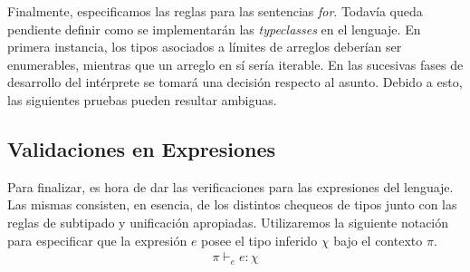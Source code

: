 \documentclass{article}
\begin{document}
Finalmente, especificamos las reglas para las sentencias \textit{for}.
Todavía queda pendiente definir como se implementarán las \textit{typeclasses} en el lenguaje.
En primera instancia, los tipos asociados a límites de arreglos deberían ser enumerables, mientras que un arreglo en sí sería iterable.
En las sucesivas fases de desarrollo del intérprete se tomará una decisión respecto al asunto.
Debido a esto, las siguientes pruebas pueden resultar ambiguas.

\begin{prooftree}
\end{prooftree}

\begin{prooftree}
\end{prooftree}

\begin{prooftree}
\end{prooftree}

\subsection{Validaciones en Expresiones}

Para finalizar, es hora de dar las verificaciones para las expresiones del lenguaje.
Las mismas consisten, en esencia, de los distintos chequeos de tipos junto con las reglas de subtipado y unificación apropiadas.
Utilizaremos la siguiente notación para especificar que la expresión $e$ posee el tipo inferido $\chi$ bajo el contexto $\pi$.
\begin{gather*}
\pi \vdash_e e : \chi
\end{gather*}
\end{document}
